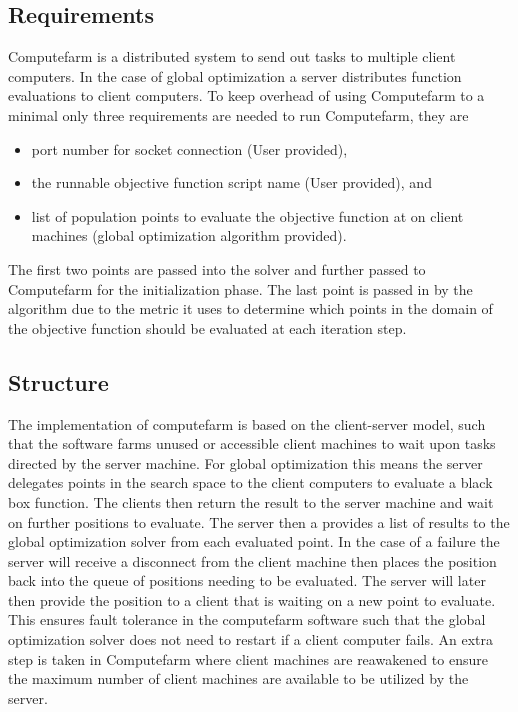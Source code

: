 \subsection{Requirements}
Computefarm is a distributed system to send out tasks to multiple client computers. In the case of global optimization a server distributes function evaluations to client computers. To keep overhead of using Computefarm to a minimal only three requirements are needed to run Computefarm, they are
\begin{itemize}
    \item port number for socket connection (User provided),
    \item the runnable objective function script name (User provided), and
    \item list of population points to evaluate the objective function at on client machines (global optimization algorithm provided).
\end{itemize}

The first two points are passed into the solver and further passed to Computefarm for the initialization phase. The last point is passed in by the algorithm due to the metric it uses to determine which points in the domain of the objective function should be evaluated at each iteration step. 
 
\subsection{Structure}
 The implementation of computefarm is based on the client-server model, such that the software farms unused or accessible client machines to wait upon tasks directed by the server machine. For global optimization this means the server delegates points in the search space to the client computers to evaluate a black box function. The clients then return the result to the server machine and wait on further positions to evaluate. The server then a provides a list of
  results to the
  global optimization solver from each evaluated point. 
  In the case of a failure the server will receive a disconnect from the client machine then places the position back into the queue of positions needing to be evaluated. The server will later then provide the position to a client that is waiting on a new point to evaluate. This ensures fault tolerance in the computefarm software such that the global optimization solver does not need to restart if a client computer fails.  
  An extra step is taken in Computefarm where client machines are reawakened to ensure the maximum number of client machines are available to be utilized by the server. 

